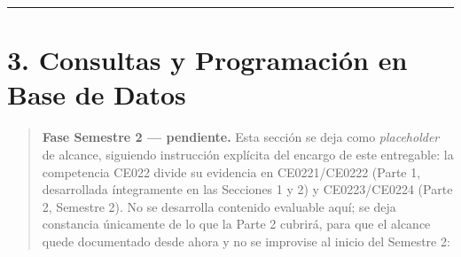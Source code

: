 \documentclass[11pt,a4paper]{article}
\begin{document}
\begin{center}\rule{0.5\linewidth}{0.5pt}\end{center}

\section{3. Consultas y Programación en Base de Datos}\label{consultas-y-programaciuxf3n-en-base-de-datos}

\begin{quote}
\textbf{Fase Semestre 2 --- pendiente.} Esta sección se deja como \emph{placeholder} de alcance, siguiendo instrucción explícita del encargo de este entregable: la competencia CE022 divide su evidencia en CE0221/CE0222 (Parte 1, desarrollada íntegramente en las Secciones 1 y 2) y CE0223/CE0224 (Parte 2, Semestre 2). No se desarrolla contenido evaluable aquí; se deja constancia únicamente de lo que la Parte 2 cubrirá, para que el alcance quede documentado desde ahora y no se improvise al inicio del Semestre 2:


\end{quote}
\end{document}

